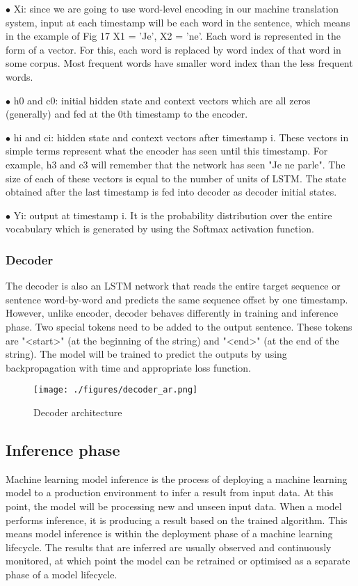 $\bullet$ Xi: since we are going to use word-level encoding in our machine translation system, input at each timestamp will be each word in the sentence, which means in the example of Fig 17 X1 = 'Je', X2 = 'ne'. Each word is represented in the form of a vector. For this, each word is replaced by word index of that word in some corpus. Most frequent words have smaller word index than the less frequent words.

$\bullet$ h0 and c0: initial hidden state and context vectors which are all zeros (generally) and fed at the 0th timestamp to the encoder. 

$\bullet$ hi and ci: hidden state and context vectors after timestamp i. These vectors in simple terms represent what the encoder has seen until this timestamp. For example, h3 and c3 will remember that the network has seen "Je ne parle". The size of each of these vectors is equal to the number of units of LSTM. The state obtained after the last timestamp is fed into decoder as decoder initial states.

$\bullet$ Yi: output at timestamp i. It is the probability distribution over the entire vocabulary which is generated by using the Softmax activation function. 
\subsubsection{Decoder}
The decoder is also an LSTM network that reads the entire target sequence or sentence word-by-word and predicts the same sequence offset by one timestamp. However, unlike encoder, decoder behaves differently in training and inference phase. Two special tokens need to be added to the output sentence. These tokens are "\textless start\textgreater" (at the beginning of the string) and "\textless end\textgreater" (at the end of the string). The model will be trained to predict the outputs by using backpropagation with time and appropriate loss function. 

\begin{figure}[h]
	\centering
	\texttt{[image: ./figures/decoder\_ar.png]}
	
	\caption{Decoder architecture}
\end{figure}

\subsection{Inference phase}
Machine learning model inference is the process of deploying a machine learning model to a production environment to infer a result from input data. At this point, the model will be processing new and unseen input data. When a model performs inference, it is producing a result based on the trained algorithm. This means model inference is within the deployment phase of a machine learning lifecycle. The results that are inferred are usually observed and continuously monitored, at which point the model can be retrained or optimised as a separate phase of a model lifecycle.

